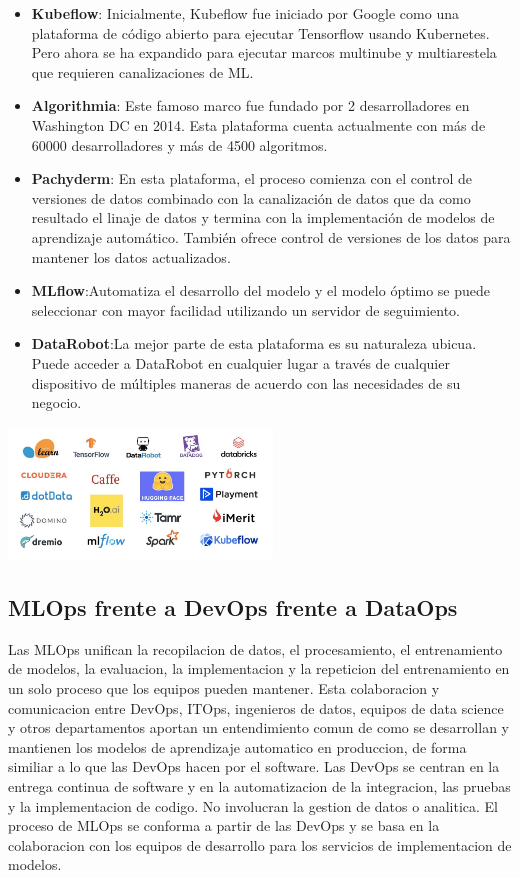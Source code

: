 \documentclass[twoside,twocolumn]{article}
\begin{document}
\begin{itemize}
    \item \textbf{Kubeflow}: Inicialmente, Kubeflow fue iniciado por Google como una plataforma de código abierto para ejecutar Tensorflow usando Kubernetes. Pero ahora se ha expandido para ejecutar marcos multinube y multiarestela que requieren canalizaciones de ML.
    \item \textbf{Algorithmia}: Este famoso marco fue fundado por 2 desarrolladores en Washington DC en 2014. Esta plataforma cuenta actualmente con más de 60000 desarrolladores y más de 4500 algoritmos.
    \item \textbf{Pachyderm}: En esta plataforma, el proceso comienza con el control de versiones de datos combinado con la canalización de datos que da como resultado el linaje de datos y termina con la implementación de modelos de aprendizaje automático. También ofrece control de versiones de los datos para mantener los datos actualizados.
    \item \textbf{MLflow}:Automatiza el desarrollo del modelo y el modelo óptimo se puede seleccionar con mayor facilidad utilizando un servidor de seguimiento.
    \item \textbf{DataRobot}:La mejor parte de esta plataforma es su naturaleza ubicua. Puede acceder a DataRobot en cualquier lugar a través de cualquier dispositivo de múltiples maneras de acuerdo con las necesidades de su negocio.
\end{itemize}
\begin{center}
    \includegraphics[width=7cm]{./img/img3.png}
\end{center}


\subsection{MLOps frente a DevOps frente a DataOps}
Las MLOps unifican la recopilacion de datos, el procesamiento, el entrenamiento de modelos, la evaluacion, la implementacion y la repeticion del entrenamiento en un solo proceso que los equipos pueden mantener. Esta colaboracion y comunicacion entre DevOps, ITOps, ingenieros de datos, equipos de data science y otros departamentos aportan un entendimiento comun de como se desarrollan y mantienen los modelos de aprendizaje automatico en produccion, de forma similiar a lo que las DevOps hacen por el software. 
Las DevOps se centran en la entrega continua de software y en la automatizacion de la integracion, las pruebas y la implementacion de codigo. No involucran la gestion de datos o analitica. El proceso de MLOps se conforma a partir de las DevOps y se basa en la colaboracion con los equipos de desarrollo para los servicios de implementacion de modelos.
\end{document}
